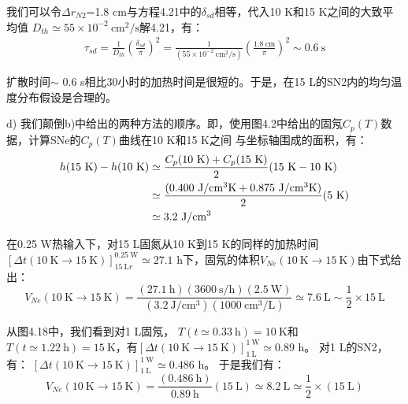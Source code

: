 我们可以令$\Delta r_{N2}$=1.8 cm与方程4.21中的$\delta_{sd}$相等，代入10 K和15 K之间的大致平均值
$D_{th}\simeq 55\times10^{−2}\ \mathrm{cm^2/s}$解4.21，有：
\begin{align*}%
\tau_{sd}=\frac{1}{D_{th}}\left(\frac{\delta_{sd}}{\pi}\right)^2
=\frac{1}{(55\times 10^{-2}\ \mathrm{cm^2/s})}\left(\frac{1.8\ \mathrm{cm}}{\pi}\right)^2\sim 0.6\ \mathrm{s} \tag{4.21}
\end{align*}

扩散时间$\sim$ 0.6 s相比30小时的加热时间是很短的。于是，在15 L的SN2内的均匀温度分布假设是合理的。

d) 我们颠倒b)中给出的两种方法的顺序。即，使用图4.2中给出的固氖$C_p(T)$数据，计算SNe的$C_p(T)$曲线在10 K和15 K之间
与坐标轴围成的面积，有：
\begin{align*}%
h(15\ \mathrm{K})-h(10\ \mathrm{K})&\simeq\frac{C_p(10\ \mathrm{K})+C_p(15\ \mathrm{K})}{2}(15\ \mathrm{K}-10\ \mathrm{K})\\\notag
&\simeq\frac{(0.400\ \mathrm{J/cm^3K}+0.875\ \mathrm{J/cm^3K})}{2}(5\ \mathrm{K})\\\notag
&\simeq 3.2\ \mathrm{J/cm^3}
\end{align*}

在0.25 W热输入下，对15 L固氮从10 K到15 K的同样的加热时间$[\Delta t(10\ \mathrm{K}\rightarrow 15\ \mathrm{K})]_{15\ \mathrm{L}r}^{0.25\ \mathrm{W}}\simeq 27.1$ h下，固氖的体积$V_{Ne}(10\ \mathrm{K}\rightarrow 15\ \mathrm{K})$由下式给出：
\begin{equation*}%
V_{Ne}(10\ \mathrm{K} \rightarrow 15\ \mathrm{K})=\frac{(27.1\ \mathrm{h})(3600\ \mathrm{s/h} )(2.5\ \mathrm{W})}{(3.2\ \mathrm{J/cm^3})(1000 \ \mathrm{cm^3/L})}
\simeq 7.6\ \mathrm{L}\sim\frac{1}{2}\times 15\ \mathrm{L}
\end{equation*}

从图4.18中，我们看到对1 L固氖， $T(t\simeq 0.33\ \mathrm{h})=10\ \mathrm{K}$和$T(t\simeq
1.22\ \mathrm{h})=15\ \mathrm{K}$，有$[\Delta t(10\ \mathrm{K}\rightarrow 15\ \mathrm{K})]_{1\ \mathrm{L}}^{1\ \mathrm{W}}\simeq 0.89$ h。
对1 L的SN2，有：
$[\Delta t(10\ \mathrm{K}\rightarrow 15\ \mathrm{K})]_{1\ \mathrm{L}}^{1\ \mathrm{W}}\simeq 0.486$ h。
于是我们有：
\begin{equation*}%
V_{Ne}(10\ \mathrm{K}\rightarrow 15\ \mathrm{K})=\frac{(0.486\ \mathrm{h})}{0.89\ \mathrm{h}}(15\ \mathrm{L})\simeq 8.2 \ \mathrm{L}\simeq\frac{1}{2}\times(15\ \mathrm{L})
\end{equation*}

